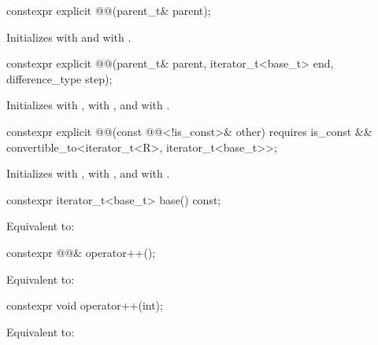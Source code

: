 \setcounter{Paras}{0}

\begin{itemdecl}
constexpr explicit @@(parent_t& parent);
\end{itemdecl}
\begin{itemdescr}
	\pnum
	\effects Initializes  with  and  with
	.
\end{itemdescr}

\begin{itemdecl}
constexpr explicit @@(parent_t& parent, iterator_t<base_t> end, difference_type step);
\end{itemdecl}
\begin{itemdescr}
	\pnum
	\effects Initializes  with ,  with
	, and  with .
\end{itemdescr}

\begin{itemdecl}
constexpr explicit @@(const @@<!is_const>& other)
  requires is_const && convertible_to<iterator_t<R>, iterator_t<base_t>>;
\end{itemdecl}
\begin{itemdescr}
	\pnum
	\effects Initializes  with ,  with
	, and  with .
\end{itemdescr}

\begin{itemdecl}
constexpr iterator_t<base_t> base() const;
\end{itemdecl}
\begin{itemdescr}
	\pnum
	\effects Equivalent to: 
\end{itemdescr}

\begin{itemdecl}
constexpr @@& operator++();
\end{itemdecl}

\begin{itemdescr}
	\pnum
	\effects Equivalent to: 
\end{itemdescr}

\begin{itemdecl}
constexpr void operator++(int);
\end{itemdecl}
\begin{itemdescr}
	\pnum
	\effects Equivalent to: 
\end{itemdescr}

